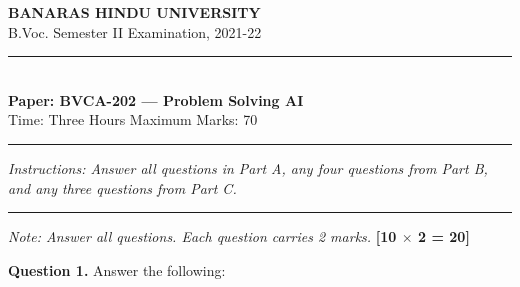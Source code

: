 \documentclass[11pt,a4paper]{article}
\begin{document}
\begin{center}
  {\large\bfseries BANARAS HINDU UNIVERSITY}\\[2pt]
  {
\normalsize B.Voc. Semester II Examination, 2021-22}\\[6pt]
  \rule{0.8\linewidth}{0.5pt}\\[6pt]
  {\large\bfseries Paper: BVCA-202 --- Problem Solving AI}\\[4pt]
  {
\normalsize Time: Three Hours \hfill Maximum Marks: 70}
\end{center}

\rule{\linewidth}{0.4pt}

\smallskip
\smallskip



\noindent   \textit{Instructions: Answer all questions in Part A, any four questions from Part B, and any three questions from Part C.}

\bigskip

\bigskip


\rule{\linewidth}{0.4pt}\smallskip




\noindent   \textit{Note: Answer all questions. Each question carries 2 marks.} \hfill   \textbf{[10 $ \times$ 2 = 20]}

\medskip


\noindent   \textbf{Question 1.} Answer the following:
\end{document}
